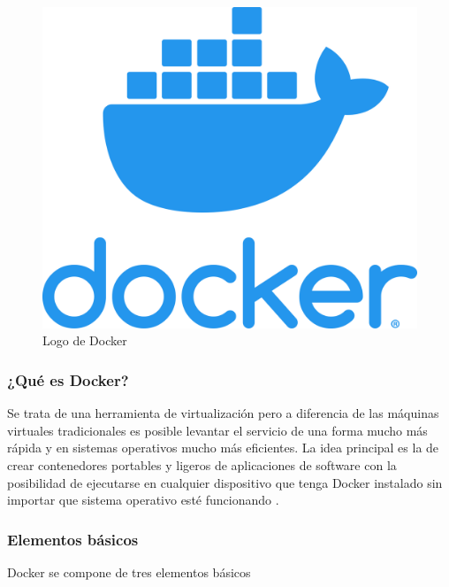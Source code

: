 \begin{figure}[H]
    \centering
    \includegraphics[scale=0.05]{include/figuras/docker.png}
    \caption{Logo de Docker}
    \label{fig:docker_icon}
\end{figure}

\subsubsection{¿Qué es Docker?}
Se trata de una herramienta de virtualización pero a diferencia de las máquinas virtuales tradicionales es posible levantar el servicio de una forma mucho más rápida y en sistemas operativos mucho más eficientes. 
La idea principal es la de crear contenedores portables y ligeros de aplicaciones de software con la posibilidad de ejecutarse en cualquier dispositivo que tenga Docker instalado sin importar que sistema operativo esté funcionando \cite{docker}.

\subsubsection{Elementos básicos}
Docker se compone de tres elementos básicos

